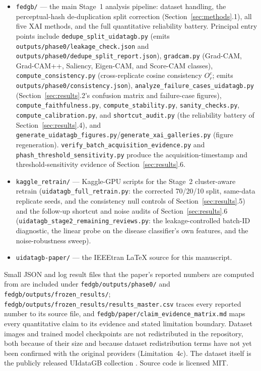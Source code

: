 \begin{itemize}
\item \texttt{fedgb/} --- the main Stage~1 analysis pipeline: dataset handling, the perceptual-hash de-duplication split correction (Section~\ref{sec:methods}.1), all five XAI methods, and the full quantitative reliability battery. Principal entry points include \texttt{dedupe\_split\_uidatagb.py} (emits \texttt{outputs/phase0/leakage\_check.json} and \texttt{outputs/phase0/dedupe\_split\_report.json}), \texttt{gradcam.py} (Grad-CAM, Grad-CAM++, Saliency, Eigen-CAM, and Score-CAM classes), \texttt{compute\_consistency.py} (cross-replicate cosine consistency $O_r^c$; emits \texttt{outputs/phase0/consistency.json}), \texttt{analyze\_failure\_cases\_uidatagb.py} (Section~\ref{sec:results}.2's confusion matrix and failure-case figures), \texttt{compute\_faithfulness.py}, \texttt{compute\_stability.py}, \texttt{sanity\_checks.py}, \texttt{compute\_calibration.py}, and \texttt{shortcut\_audit.py} (the reliability battery of Section~\ref{sec:results}.4), and \texttt{generate\_uidatagb\_figures.py}/\texttt{generate\_xai\_galleries.py} (figure regeneration). \texttt{verify\_batch\_acquisition\_evidence.py} and \texttt{phash\_threshold\_sensitivity.py} produce the acquisition-timestamp and threshold-sensitivity evidence of Section~\ref{sec:results}.6.
\item \texttt{kaggle\_retrain/} --- Kaggle-GPU scripts for the Stage~2 cluster-aware retrain (\texttt{uidatagb\_full\_retrain.py}: the corrected 70/20/10 split, same-data replicate seeds, and the consistency null controls of Section~\ref{sec:results}.5) and the follow-up shortcut and noise audits of Section~\ref{sec:results}.6 (\texttt{uidatagb\_stage2\_remaining\_reviews.py}: the leakage-controlled batch-ID diagnostic, the linear probe on the disease classifier's own features, and the noise-robustness sweep).
\item \texttt{uidatagb-paper/} --- the IEEEtran LaTeX source for this manuscript.
\end{itemize}

Small JSON and log result files that the paper's reported numbers are computed from are included under \texttt{fedgb/outputs/phase0/} and \texttt{fedgb/outputs/frozen\_results/}; \texttt{fedgb/outputs/frozen\_results/results\_master.csv} traces every reported number to its source file, and \texttt{fedgb/paper/claim\_evidence\_matrix.md} maps every quantitative claim to its evidence and stated limitation boundary. Dataset images and trained model checkpoints are not redistributed in the repository, both because of their size and because dataset redistribution terms have not yet been confirmed with the original providers (Limitation~4c). The dataset itself is the publicly released UIdataGB collection \cite{ref17}. Source code is licensed MIT.

